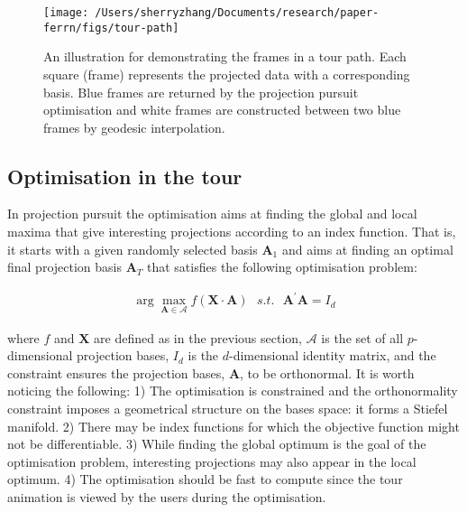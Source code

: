 \begin{Schunk}
\begin{figure}

{\centering \texttt{[image: /Users/sherryzhang/Documents/research/paper-ferrn/figs/tour-path]} 

}

\caption[An illustration for demonstrating the frames in a tour path]{An illustration for demonstrating the frames in a tour path. Each square (frame) represents the projected data with a corresponding basis. Blue frames are returned by the projection pursuit optimisation and white frames are constructed between two blue frames by geodesic interpolation.}\label{fig:tour-path}
\end{figure}
\end{Schunk}

\hypertarget{tour-optim}{%
\subsection{Optimisation in the tour}\label{tour-optim}}

In projection pursuit the optimisation aims at finding the global and
local maxima that give interesting projections according to an index
function. That is, it starts with a given randomly selected basis
\(\mathbf{A}_1\) and aims at finding an optimal final projection basis
\(\mathbf{A}_T\) that satisfies the following optimisation problem:

\begin{align}
\arg \max_{\mathbf{A} \in \mathcal{A}} f(\mathbf{X} \cdot \mathbf{A})  ~~~ s.t. ~~~ \mathbf{A}^{\prime} \mathbf{A} = I_d
\end{align}

\noindent where \(f\) and \(\mathbf{X}\) are defined as in the previous
section, \(\mathcal{A}\) is the set of all \(p\)-dimensional projection
bases, \(I_d\) is the \(d\)-dimensional identity matrix, and the
constraint ensures the projection bases, \(\mathbf{A}\), to be
orthonormal. It is worth noticing the following: 1) The optimisation is
constrained and the orthonormality constraint imposes a geometrical
structure on the bases space: it forms a Stiefel manifold. 2) There may
be index functions for which the objective function might not be
differentiable. 3) While finding the global optimum is the goal of the
optimisation problem, interesting projections may also appear in the
local optimum. 4) The optimisation should be fast to compute since the
tour animation is viewed by the users during the optimisation.

